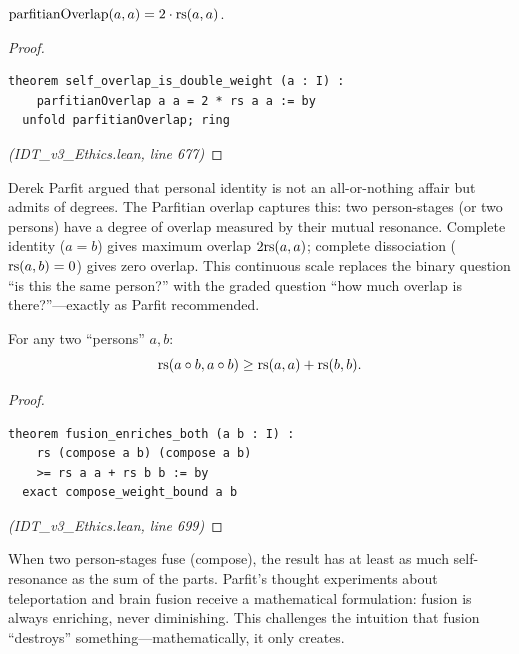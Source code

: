 \begin{theorem}
\label{thm:self-overlap}
$\mathrm{parfitianOverlap}(a, a) = 2 \cdot \mathrm{rs}(a, a)$.
\end{theorem}

\begin{proof}
\begin{lstlisting}
theorem self_overlap_is_double_weight (a : I) :
    parfitianOverlap a a = 2 * rs a a := by
  unfold parfitianOverlap; ring
\end{lstlisting}
\textit{(IDT\_v3\_Ethics.lean, line 677)}
\end{proof}

\begin{interpretation}
Derek Parfit argued that personal identity is not an all-or-nothing affair but
admits of degrees. The Parfitian overlap captures this: two person-stages
(or two persons) have a degree of overlap measured by their mutual resonance.
Complete identity ($a = b$) gives maximum overlap $2\mathrm{rs}(a,a)$; complete
dissociation ($\mathrm{rs}(a,b) = 0$) gives zero overlap. This continuous scale
replaces the binary question ``is this the same person?'' with the graded
question ``how much overlap is there?''---exactly as Parfit recommended.
\end{interpretation}

\begin{theorem}
\label{thm:fusion-enriches}
For any two ``persons'' $a, b$:
\[
  \mathrm{rs}(a \circ b, a \circ b) \geq \mathrm{rs}(a, a) + \mathrm{rs}(b, b).
\]
\end{theorem}

\begin{proof}
\begin{lstlisting}
theorem fusion_enriches_both (a b : I) :
    rs (compose a b) (compose a b)
    >= rs a a + rs b b := by
  exact compose_weight_bound a b
\end{lstlisting}
\textit{(IDT\_v3\_Ethics.lean, line 699)}
\end{proof}

\begin{interpretation}
When two person-stages fuse (compose), the result has at least as much
self-resonance as the sum of the parts. Parfit's thought experiments about
teleportation and brain fusion receive a mathematical formulation: fusion
is always enriching, never diminishing. This challenges the intuition that
fusion ``destroys'' something---mathematically, it only creates.
\end{interpretation}


